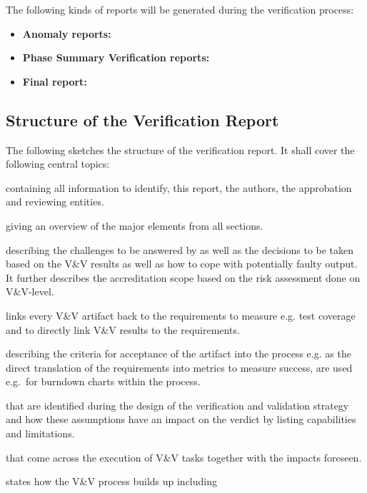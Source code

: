 \documentclass{template/openetcs_report}
\begin{document}
The following kinds of reports will be generated during the verification process:
\begin{itemize}
\item \textbf{Anomaly reports:} 
\item \textbf{Phase Summary Verification reports:} 
\item \textbf{Final report:}
\end{itemize}

\subsection{Structure of the Verification Report}
\label{sec:struct-verif-report}

The following sketches the structure of the verification report. It
shall cover the following central topics:
\begin{description}\setlength{\parsep}{0pt}\setlength{\itemsep}{0pt}\setlength{\topsep}{0pt}
\item[Header] containing all information to identify, this report, the
  authors, the approbation and reviewing entities.
\item[Executive Summary] giving an overview of the major elements from
  all sections. 
\item[Problem Statement] describing the challenges to be answered by
  \VV as well as the decisions to be taken based on the V\&V results
  as well as how to cope with potentially faulty output. It further
  describes the accreditation scope based on the risk assessment done
  on V\&V-level. 
\item[V\&V Requirements Traceability Matrix] links every V\&V artifact
  back to the requirements to measure e.g. test coverage and to
  directly link V\&V results to the requirements. 
\item[Acceptability Criteria,] describing the criteria for acceptance
  of the artifact into the \VV process e.g. as the direct translation
  of the requirements into metrics to measure success, are used
  e.g.\ for burndown charts within the process. 
\item[Assumptions] that are identified during the design of the
  verification and validation strategy and how these assumptions have
  an impact on the verdict by listing capabilities and limitations. 
\item[Risks and Impacts] that come across the execution of V\&V tasks
  together with the impacts foreseen. 
\item[V\&V Design] states how the V\&V process builds up including

\end{description}
\end{document}
